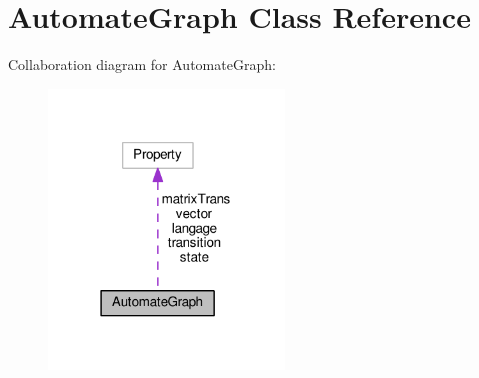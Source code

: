 \hypertarget{class_automate_graph}{}\section{Automate\+Graph Class Reference}
\label{class_automate_graph}


Collaboration diagram for Automate\+Graph\+:\nopagebreak
\begin{figure}[H]
\begin{center}
\leavevmode
\includegraphics[width=178pt]{class_automate_graph__coll__graph}
\end{center}
\end{figure}
